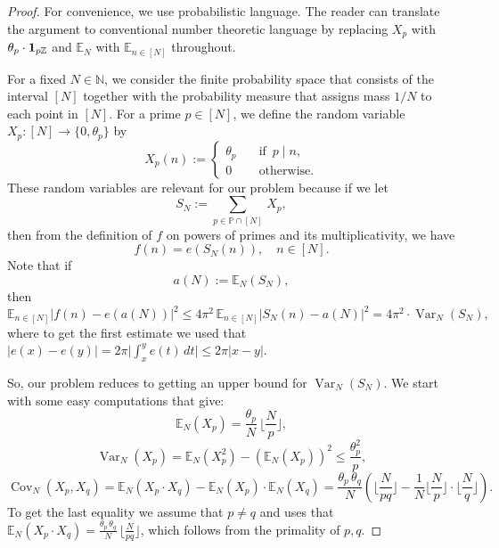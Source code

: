 \documentclass[11pt]{amsart}
\theoremstyle{definition}
\newcommand{\E}{{\mathbb E}}
\newcommand{\N}{{\mathbb N}}
\renewcommand{\P}{{\mathbb P}}
\newcommand{\Z}{{\mathbb Z}}
\newcommand{\Var}{\operatorname{Var}}
\newcommand{\Cov}{\operatorname{Cov}}
\begin{document}
\begin{proof}
For convenience, we use probabilistic language. The reader can translate the argument to conventional number theoretic language by replacing $X_p$ with $\theta_p\cdot {\bf 1}_{p\Z}$
and $\E_N$ with $\E_{n\in[N]}$ throughout.


	For a fixed $N\in \N$, we  consider the finite probability space that consists of the  interval $[N]$ together with the probability measure that  assigns mass $1/N$ to each point in $[N]$. For a prime $p\in [N]$, we define the random variable
	$ X_p\colon [N]\to \{0,\theta_p\}$ by
	$$
	X_p(n):=
	\begin{cases} \theta_p \quad & \text {if } \, p\mid n, \\
		0 & \text{otherwise}.
	\end{cases}
	$$
	These random variables are relevant for our problem because if  we let
	$$
	S_N:=\sum_{p\in \P\cap [N]}\, X_p,
	$$
	then from the definition of $f$ on powers of primes and its multiplicativity, we have
	$$
	f(n)=e(S_N(n)), \quad n\in [N].
	$$
	Note that if
	$$
	a(N):=\E_N(S_N),
	$$
	then
	\begin{equation}\label{E:Var1}
		\E_{n\in [N]}|f(n)-e(a(N))|^2\leq 4\pi^2\,  \E_{n\in [N]}|S_N(n)-a(N)|^2=4 \pi^2\cdot \Var_N(S_N),
	\end{equation}
	where to get the first estimate we used that $|e(x)-e(y)|=2\pi \big|\int_x^y e(t)\, dt\big|\leq 2\pi|x-y|$.
	
	So, our problem reduces to getting an upper  bound  for   $ \Var_N(S_N)$.
	We start with some   easy computations that give:
\begin{equation}\label{srednia}
	\E_N(X_p)= \frac{\theta_p}{N}\, \Big\lfloor\frac{N}{p}\Big\rfloor,
\end{equation}
	$$
	\Var_N(X_p)= \E_N(X_p^2)-(\E_N(X_p))^2\leq \frac{\theta_p^2}{p},
	$$
	$$
	\Cov_N(X_p,X_q)=\E_N(X_p\cdot X_q)-\E_N(X_p)\cdot \E_N(X_q) = \frac{\theta_p\, \theta_q}{N}\left(\Big\lfloor\frac{N}{pq}\Big\rfloor - \frac{1}{N}\Big\lfloor\frac{N}{p}\Big\rfloor \cdot \Big\lfloor\frac{N}{q}\Big\rfloor\right).
	$$
	To get the last equality we assume that $p\neq q$ and uses  that $\E_N(X_p\cdot X_q)=\frac{\theta_p\, \theta_q}{N}\, \Big\lfloor\frac{N}{pq}\Big\rfloor$, which follows from
	the primality of $p,q$.
	

\end{proof}
\end{document}
